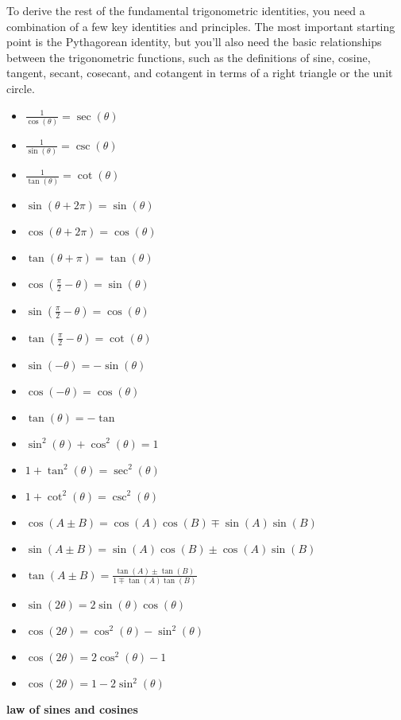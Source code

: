 \documentclass{article}
\begin{document}
To derive the rest of the fundamental trigonometric identities, you need a combination of a few key identities and principles. The most important starting point is the Pythagorean identity, but you’ll also need the basic relationships between the trigonometric functions, such as the definitions of sine, cosine, tangent, secant, cosecant, and cotangent in terms of a right triangle or the unit circle.
	\begin{itemize}
		\item $\frac{1}{\cos(\theta)} = \sec(\theta)$	
		\item $\frac{1}{\sin(\theta)} = \csc(\theta) $
		\item $\frac{1}{\tan(\theta)} = \cot(\theta)$
		\item $\sin(\theta + 2\pi) = \sin(\theta)$
		\item $\cos(\theta + 2\pi) = \cos(\theta)$
		\item $\tan(\theta + \pi) = \tan(\theta)$
		\item $\cos(\frac{\pi}{2} - \theta) = \sin(\theta)$
		\item $\sin(\frac{\pi}{2} - \theta) = \cos(\theta)$
		\item $\tan(\frac{\pi}{2} - \theta) = \cot(\theta)$
		\item $\sin(-\theta) = -\sin(\theta)$
		\item $\cos(-\theta) = \cos(\theta)$
		\item $\tan(\theta) = -\tan$
		\item $\sin^2(\theta) + \cos^2(\theta) = 1$
		\item $1 + \tan^2(\theta) = \sec^2(\theta)$
		\item $1 + \cot^2(\theta) = \csc^2(\theta)$
		\item $\cos(A \pm B) = \cos(A)\cos(B) \mp \sin(A)\sin(B)$		
		\item $\sin(A \pm B) = \sin(A)\cos(B) \pm \cos(A)\sin(B)$
		\item $\tan(A \pm B) = \frac{\tan(A) \pm \tan(B)}{1 \mp \tan(A)\tan(B)}$
		\item $\sin(2\theta) = 2\sin(\theta)\cos(\theta)$
		\item $\cos(2\theta) = \cos^2(\theta) - \sin^2(\theta)$		
		\item $\cos(2\theta) = 2\cos^2(\theta) - 1$
		\item $\cos(2\theta) = 1 - 2\sin^2(\theta)$
	\end{itemize}



\textbf{law of sines and cosines}\\
\end{document}
